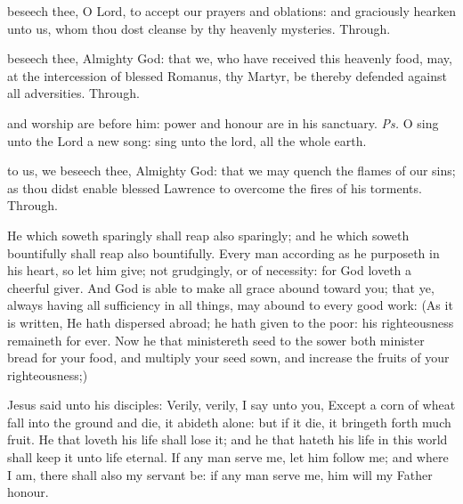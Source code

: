 \secret\label{RomanusSecret}
 beseech thee, O Lord, to accept our prayers and oblations: and graciously hearken unto us, whom thou dost cleanse by thy heavenly mysteries. Through.

\postcommunion\label{RomanusPostcommunion}
 beseech thee, Almighty God: that we, who have received this heavenly food, may, at the intercession of blessed Romanus, thy Martyr, be thereby defended against all adversities. Through.



\introit
{} and worship are before him: power and honour are in his sanctuary. \textit{Ps.} O sing unto the Lord a new song: sing unto the lord, all the whole earth.

\collect
{} to us, we beseech thee, Almighty God: that we may quench the flames of our sins; as thou didst enable blessed Lawrence to overcome the fires of his torments. Through.

 He which soweth sparingly shall reap also sparingly; and he which soweth bountifully shall reap also bountifully. Every man according as he purposeth in his heart, so let him give; not grudgingly, or of necessity: for God loveth a cheerful giver. And God is able to make all grace abound toward you; that ye, always having all sufficiency in all things, may abound to every good work: (As it is written, He hath dispersed abroad; he hath given to the poor: his righteousness remaineth for ever. Now he that ministereth seed to the sower both minister bread for your food, and multiply your seed sown, and increase the fruits of your righteousness;)



 Jesus said unto his disciples: Verily, verily, I say unto you, Except a corn of wheat fall into the ground and die, it abideth alone: but if it die, it bringeth forth much fruit. He that loveth his life shall lose it; and he that hateth his life in this world shall keep it unto life eternal. If any man serve me, let him follow me; and where I am, there shall also my servant be: if any man serve me, him will my Father honour.

